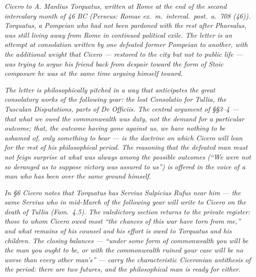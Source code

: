 
\textit{Cicero to A. Manlius Torquatus, written at Rome at the
end of the second intercalary month of 46 BC (Perseus:
\textit{Romae ex.~m.~intercal.~post.~a.~708 (46)}). Torquatus, a
Pompeian who had not been pardoned with the rest after Pharsalus,
was still living away from Rome in continued political exile.
The letter is an attempt at consolation written by one defeated
former Pompeian to another, with the additional weight that
Cicero --- restored to the city but not to public life --- was
trying to argue his friend back from despair toward the form of
Stoic composure he was at the same time arguing himself toward.}

\textit{The letter is philosophically pitched in a way that
anticipates the great consolatory works of the following year:
the lost \textit{Consolatio} for Tullia, the \textit{Tusculan
Disputations}, parts of \textit{De Officiis}. The central
argument of \S\S 3--4 --- that what we owed the commonwealth was
duty, not the demand for a particular outcome; that, the outcome
having gone against us, we have nothing to be ashamed of, only
something to bear --- is the doctrine on which Cicero will lean
for the rest of his philosophical period. The reasoning that
the defeated man must not feign surprise at what was always among
the possible outcomes (``We were not so deranged as to suppose
victory was assured to us'') is offered in the voice of a man
who has been over the same ground himself.}

\textit{In \S 6 Cicero notes that Torquatus has Servius Sulpicius
Rufus near him --- the same Servius who in mid-March of the
following year will write to Cicero on the death of Tullia
(\textit{Fam.}~4.5). The valedictory section returns to the
private register: those to whom Cicero owed most ``the chances of
this war have torn from me,'' and what remains of his counsel and
his effort is owed to Torquatus and his children. The closing
balances --- ``under some form of commonwealth you will be the
man you ought to be, or with the commonwealth ruined your case
will be no worse than every other man's'' --- carry the
characteristic Ciceronian antithesis of the period: there are
two futures, and the philosophical man is ready for either.}
